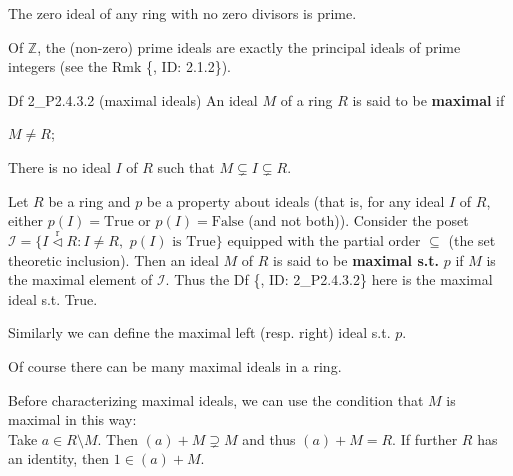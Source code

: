 \documentclass{article}
\newcommand{\nles}{\vartriangleleft}
\newcommand{\ideal}{\overset{\text{r}}{\nles}} %
\begin{document}
\begin{Rmk}{}
    \begin{compactenum}
        \item \textcolor{Th}{The zero ideal of any ring with no zero divisors is prime.} 
        \item \textcolor{Th}{Of $\mathbb{Z}$, the (non-zero) prime ideals are exactly the principal ideals of prime integers} (see the Rmk \{, ID: 2.1.2\}).
    \end{compactenum}
\end{Rmk}

\begin{Df}{Df 2\_P2.4.3.2 (maximal ideals)}
    An ideal $M$ of a ring $R$ is said to be \textbf{maximal} if
    \begin{compactenum}
        \item $M\neq R$;
        \item There is no ideal $I$ of $R$ such that $M\subsetneq I\subsetneq R$.
    \end{compactenum}
\end{Df}

\begin{Rmk}{}
    \begin{compactenum}
        \item \textcolor{Df}{Let $R$ be a ring and $p$ be a property about ideals (that is, for any ideal $I$ of $R$, either $p(I) = \text{True}$ or $p(I) = \text{False}$ (and not both)). Consider the poset $\mathcal{I} = \{I\ideal R: I\neq R,\,\, p(I) \text{ is True}\}$ equipped with the partial order $\subseteq$ (the set theoretic inclusion). Then an ideal $M$ of $R$ is said to be \textbf{maximal s.t.} $p$ if $M$ is the maximal element of $\mathcal{I}$.} \textcolor{Th}{Thus the Df \{, ID: 2\_P2.4.3.2\} here is the maximal ideal s.t. True.}
        \item \textcolor{Df}{Similarly we can define the maximal left (resp. right) ideal s.t. $p$.} 
        \item \textcolor{Th}{Of course there can be many maximal ideals in a ring.} 
    \end{compactenum}
    Before characterizing maximal ideals, we can use the condition that $M$ is maximal in this way: \\
    Take $a\in R\setminus M$. Then $(a)+M\supsetneq M$ and thus $(a)+M = R$. If further $R$ has an identity, then $1\in (a)+M$. 
\end{Rmk}
\end{document}
